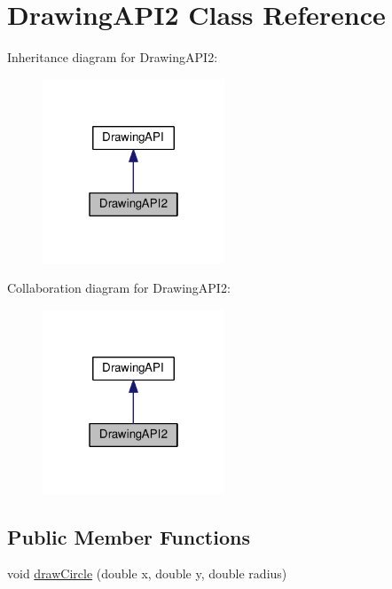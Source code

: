 \hypertarget{classDrawingAPI2}{}\section{Drawing\+A\+P\+I2 Class Reference}
\label{classDrawingAPI2}


Inheritance diagram for Drawing\+A\+P\+I2\+:
\nopagebreak
\begin{figure}[H]
\begin{center}
\leavevmode
\includegraphics[width=154pt]{classDrawingAPI2__inherit__graph}
\end{center}
\end{figure}


Collaboration diagram for Drawing\+A\+P\+I2\+:
\nopagebreak
\begin{figure}[H]
\begin{center}
\leavevmode
\includegraphics[width=154pt]{classDrawingAPI2__coll__graph}
\end{center}
\end{figure}
\subsection*{Public Member Functions}
\begin{DoxyCompactItemize}
\item 
void \hyperlink{classDrawingAPI2_a1a5df894023a891c2fc53ca76197bb01}{draw\+Circle} (double x, double y, double radius)
\end{DoxyCompactItemize}


